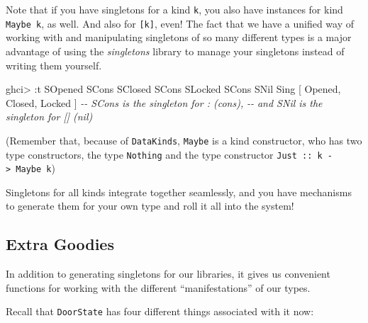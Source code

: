 \documentclass[]{article}
\newenvironment{Shaded}{}{}
\newcommand{\CommentTok}[1]{\textcolor[rgb]{0.38,0.63,0.69}{\textit{#1}}}
\newcommand{\DataTypeTok}[1]{\textcolor[rgb]{0.56,0.13,0.00}{#1}}
\newcommand{\NormalTok}[1]{#1}
\newcommand{\OperatorTok}[1]{\textcolor[rgb]{0.40,0.40,0.40}{#1}}
\newcommand{\OtherTok}[1]{\textcolor[rgb]{0.00,0.44,0.13}{#1}}
\begin{document}
Note that if you have singletons for a kind \texttt{k}, you also have instances
for kind \texttt{Maybe\ k}, as well. And also for \texttt{{[}k{]}}, even! The
fact that we have a unified way of working with and manipulating singletons of
so many different types is a major advantage of using the \emph{singletons}
library to manage your singletons instead of writing them yourself.

\begin{Shaded}
\begin{Highlighting}[]
\NormalTok{ghci}\OperatorTok{>} \OperatorTok{:}\NormalTok{t }\DataTypeTok{SOpened} \OtherTok{\textasciigrave{}SCons\textasciigrave{}} \DataTypeTok{SClosed} \OtherTok{\textasciigrave{}SCons\textasciigrave{}} \DataTypeTok{SLocked} \OtherTok{\textasciigrave{}SCons\textasciigrave{}} \DataTypeTok{SNil}
\DataTypeTok{Sing}\NormalTok{ \textquotesingle{}[ }\DataTypeTok{\textquotesingle{}Opened}\NormalTok{, }\DataTypeTok{\textquotesingle{}Closed}\NormalTok{, }\DataTypeTok{\textquotesingle{}Locked}\NormalTok{ ]}
\CommentTok{{-}{-} \textquotesingle{}SCons is the singleton for \textasciigrave{}:\textasciigrave{} (cons),}
\CommentTok{{-}{-} and \textquotesingle{}SNil is the singleton for \textasciigrave{}[]\textasciigrave{} (nil)}
\end{Highlighting}
\end{Shaded}

(Remember that, because of \texttt{DataKinds}, \texttt{Maybe} is a kind
constructor, who has two type constructors, the type
\texttt{\textquotesingle{}Nothing} and the type constructor
\texttt{\textquotesingle{}Just\ ::\ k\ -\textgreater{}\ Maybe\ k})

Singletons for all kinds integrate together seamlessly, and you have mechanisms
to generate them for your own type and roll it all into the system!

\hypertarget{extra-goodies}{%
\subsection{Extra Goodies}\label{extra-goodies}}

In addition to generating singletons for our libraries, it gives us convenient
functions for working with the different ``manifestations'' of our types.

Recall that \texttt{DoorState} has four different things associated with it now:
\end{document}
